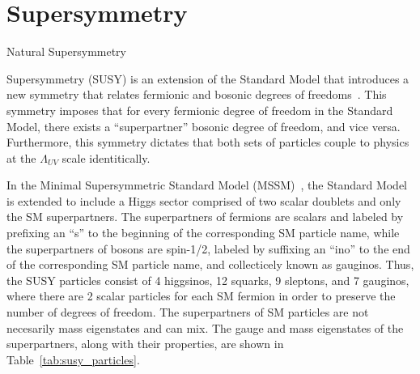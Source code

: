 \chapter{Supersymmetry}
\begin{section}{Natural Supersymmetry}

Supersymmetry (SUSY) is an extension of the Standard Model that introduces a new symmetry that relates fermionic and bosonic degrees of freedoms~\cite{ref:hierarchy1,ref:hierarchy2,Ramond:1971gb,Golfand:1971iw,Neveu:1971rx,Volkov:1972jx,Wess:1973kz,Wess:1974tw,Fayet:1974pd,Nilles:1983ge}.
This symmetry imposes that for every fermionic degree of freedom in the Standard Model, there exists a ``superpartner'' bosonic degree of freedom, and vice versa.
Furthermore, this symmetry dictates that both sets of particles couple to physics at the $\Lambda_{UV}$ scale identitically.

In the Minimal Supersymmetric Standard Model (MSSM)~\cite{Csaki:1996ks}, the Standard Model is extended to include a Higgs sector comprised of two scalar doublets and only the SM superpartners.
The superpartners of fermions are scalars and labeled by prefixing an ``s'' to the beginning of the corresponding SM particle name, while the superpartners of bosons are spin-1/2, labeled by suffixing an ``ino'' to the end of the corresponding SM particle name, and collecticely known as gauginos.
Thus, the SUSY particles consist of 4 higgsinos, 12 squarks, 9 sleptons, and 7 gauginos, where there are 2 scalar particles for each SM fermion in order to preserve the number of degrees of freedom.
The superpartners of SM particles are not necesarily mass eigenstates and can mix.
The gauge and mass eigenstates of the superpartners, along with their properties, are shown in Table~\ref{tab:susy_particles}.


\end{section}
